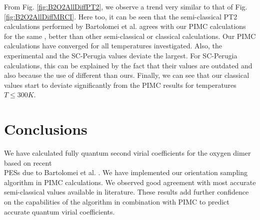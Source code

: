     From Fig. \ref{fig:B2O2AllDiffPT2}, we observe a trend very similar to that of Fig. \ref{fig:B2O2AllDiffMRCI}. Here too, it can be seen that the semi-classical PT2 calculations performed by Bartolomei et al. \cite{Bartolomei2010} agrees with our PIMC calculations for the same \PESs{}, better than other semi-classical or classical calculations. Our PIMC calculations have converged for all temperatures investigated. Also, the experimental and the SC-Perugia values deviate the largest. For SC-Perugia calculations, this can be explained by the fact that their values are outdated and also because the use of different \PESs{} than ours. Finally, we can see that our classical values start to deviate significantly from the PIMC results for temperatures $T \le 300K$.

    \section{Conclusions}
        We have calculated fully quantum second virial coefficients for the oxygen dimer based on recent \abinitio{} \\PESs{} due to Bartolomei et al. \cite{Bartolomei2010}. We have implemented our orientation sampling algorithm in PIMC calculations. We observed good agreement with most accurate semi-classical values available in literature. These results add further confidence on the capabilities of the algorithm in combination with PIMC to predict accurate quantum virial coefficients.
    

